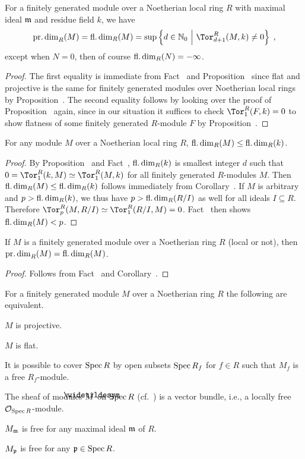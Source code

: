 \documentclass[a4paper,parskip=half,numbers=enddot, DIV=12]{scrreprt}
\begin{document}
\begin{cor}
	For a finitely generated module over a Noetherian local ring $R$ with maximal ideal $\mathfrak{m}$ and residue field $k$, we have
	\begin{align*}
		\pdim_R(M)=\fdim_R(M)=\sup\left\{d\in\IN_0\st \Tor_{d+1}^R(M,k)\neq 0\right\}\;,
	\end{align*}
	except when $N=0$, then of course $\operatorname{fl.dim}_R(N)=-\infty$.
\end{cor}
\begin{proof}
	The first equality is immediate from Fact~ and Proposition~ since flat and projective is the same for finitely generated modules over Noetherian local rings by Proposition~. The second equality follows by looking over the proof of Proposition~ again, since in our situation it suffices to check $\Tor_1^R(F,k)=0$ to show flatness of some finitely generated $R$-module $F$ by Proposition~.
\end{proof}
\begin{cor}
	For any module $M$ over a Noetherian local ring $R$, $\operatorname{fl.dim}_R(M)\leq \operatorname{fl.dim}_R(k)$.
\end{cor}
\begin{proof}
	By Proposition~ and Fact~, $\operatorname{fl.dim}_R(k)$ is smallest integer $d$ such that $0=\Tor_1^R(k,M)\simeq \Tor_1^R(M,k)$ for all finitely generated $R$-modules $M$. Then $\operatorname{fl.dim}_R(M)\leq \operatorname{fl.dim}_R(k)$ follows immediately from Corollary~. If $M$ is arbitrary and $p>\operatorname{fl.dim}_R(k)$, we thus have $p>\operatorname{fl.dim}_R(R/I)$ as well for all ideals $I\subseteq R$. Therefore $\Tor_p^R(M,R/I)\simeq \Tor_1^R(R/I,M)=0$. Fact~ then shows $\operatorname{fl.dim}_R(M)<p$.
\end{proof}
\begin{cor}
	If $M$ is a finitely generated module over a Noetherian ring $R$ (local or not), then $\operatorname{pr.dim}_R(M)=\operatorname{fl.dim}_R(M)$.
\end{cor}
\begin{proof}
	Follows from Fact~ and Corollary~.
\end{proof}
\begin{prop}
	For a finitely generated module $M$ over a Noetherian ring $R$ the following are equivalent.
	\begin{alphanumerate}
		\item $M$ is projective.
		\item $M$ is flat.
		\item It is possible to cover $\operatorname{Spec} R$ by open subsets $\operatorname{Spec} R_{f}$ for $f\in R$ such that $M_f$ is a free $R_f$-module.
		\item The sheaf of modules $\snake{M}$ on $\operatorname{Spec} R$ (cf.\ \cite[Definition~1.4.1]{alggeo1}) is a vector bundle, i.e., a locally free $\mathcal{O}_{\operatorname{Spec} R}$-module.
		\item $M_{\mathfrak{m}}$ is free for any maximal ideal $\mathfrak{m}$ of $R$.
		\item $M_{\mathfrak{p}}$ is free for any $\mathfrak{p}\in\operatorname{Spec} R$.
	\end{alphanumerate}
\end{prop}
\end{document}
